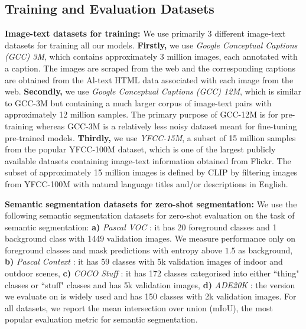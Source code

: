 \documentclass[10pt,twocolumn,letterpaper]{article}
\begin{document}
\subsection {Training and Evaluation Datasets}
\label{app:training_eval_datasets}

\textbf{Image-text datasets for training: } We use primarily 3 different image-text datasets for training all our models. \textbf{Firstly,} we use \emph{Google Conceptual Captions (GCC) 3M}, which contains approximately 3 million images, each annotated with a caption. The images are scraped from the web and the corresponding captions are obtained from the Al-text HTML data associated with each image from the web. \textbf{Secondly,} we use \emph{Google Conceptual Captions (GCC) 12M}, which is similar to GCC-3M but containing a much larger corpus of image-text pairs with approximately 12 million samples. The primary purpose of GCC-12M is for pre-training whereas GCC-3M is a relatively less noisy dataset meant for fine-tuning pre-trained models. \textbf{Thirdly,} we use \emph{YFCC-15M}, a subset of 15 million samples from the popular YFCC-100M \cite{thomee2016yfcc100m} dataset, which is one of the largest publicly available datasets containing image-text information obtained from Flickr. The subset of approximately 15 million images is defined by CLIP \cite{radford2021learning} by filtering images from YFCC-100M with natural language titles and/or descriptions in English.   

\textbf{Semantic segmentation datasets for zero-shot segmentation: } We use the following semantic segmentation datasets for zero-shot evaluation on the task of semantic segmentation: \textbf{a)} \emph{Pascal VOC} \cite{Everingham10}: it has 20 foreground classes and 1 background class with 1449 validation images. We measure performance only on foreground classes and mask predictions with entropy above $1.5$ as background, \textbf{b)} \emph{Pascal Context} \cite{mottaghi_cvpr14}: it has 59 classes with 5k validation images of indoor and outdoor scenes, \textbf{c)} \emph{COCO Stuff} \cite{caesar2018coco}: it has 172 classes categorised into either ``thing" classes or ``stuff" classes and has 5k validation images, \textbf{d)} \emph{ADE20K} \cite{zhou2017scene}: the version we evaluate on is widely used and has 150 classes with 2k validation images. For all datasets, we report the mean intersection over union (mIoU), the most popular evaluation metric for semantic segmentation.
\end{document}
